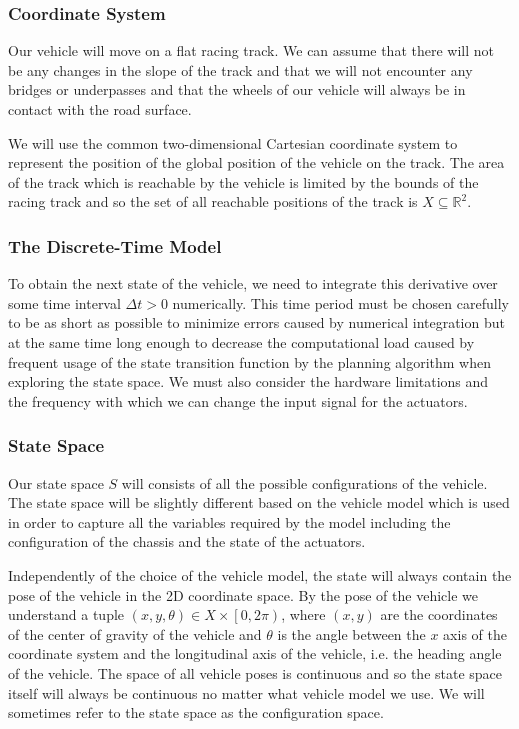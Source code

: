 \subsubsection{Coordinate System}

Our vehicle will move on a flat racing track. We can assume that there will not be any changes in the slope of the track and that we will not encounter any bridges or underpasses and that the wheels of our vehicle will always be in contact with the road surface.

We will use the common two-dimensional Cartesian coordinate system to represent the position of the global position of the vehicle on the track. The area of the track which is reachable by the vehicle is limited by the bounds of the racing track and so the set of all reachable positions of the track is $X\subseteq\mathbb{R}^2$.

\subsubsection{The Discrete-Time Model}


To obtain the next state of the vehicle, we need to integrate this derivative over some time interval $\Delta t > 0$ numerically. This time period must be chosen carefully to be as short as possible to minimize errors caused by numerical integration but at the same time long enough to decrease the computational load caused by frequent usage of the state transition function by the planning algorithm when exploring the state space. We must also consider the hardware limitations and the frequency with which we can change the input signal for the actuators.


\subsubsection{State Space}

Our state space $S$ will consists of all the possible configurations of the vehicle. The state space will be slightly different based on the vehicle model which is used in order to capture all the variables required by the model including the configuration of the chassis and the state of the actuators.

Independently of the choice of the vehicle model, the state will always contain the pose of the vehicle in the 2D coordinate space. By the pose of the vehicle we understand a tuple $\left( x, y, \theta\right)\in X\times \left[0, 2\pi\right)$, where $\left( x, y\right)$ are the coordinates of the center of gravity of the vehicle and $\theta$ is the angle between the $x$ axis of the coordinate system and the longitudinal axis of the vehicle, i.e. the heading angle of the vehicle.  The space of all vehicle poses is continuous and so the state space itself will always be continuous no matter what vehicle model we use. We will sometimes refer to the state space as the configuration space.

